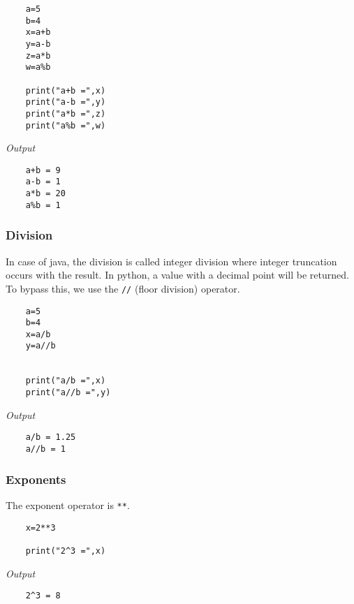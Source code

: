 \documentclass{report}
\begin{document}
	\vspace{-15pt}
	\begin{verbatim}
	a=5
	b=4
	x=a+b
	y=a-b
	z=a*b
	w=a%b
	
	print("a+b =",x)
	print("a-b =",y)
	print("a*b =",z)
	print("a%b =",w)
	\end{verbatim}
	\vspace{-10pt}
	
	\textit{Output}
	\vspace{-15pt}
	\begin{verbatim}
	a+b = 9
	a-b = 1
	a*b = 20
	a%b = 1
	\end{verbatim}
	\vspace{-10pt}
	
	\subsubsection{Division}
	In case of java, the division is called integer division where integer truncation occurs with the result. In python, a value with a decimal point will be returned. To bypass this, we use the \verb|//| (floor division) operator. 
	
	\vspace{-15pt}
	\begin{verbatim}
	a=5
	b=4
	x=a/b
	y=a//b
	
	
	print("a/b =",x)
	print("a//b =",y)
	\end{verbatim}
	\vspace{-10pt}
	
	\textit{Output}
	\vspace{-15pt}
	\begin{verbatim}
	a/b = 1.25
	a//b = 1
	\end{verbatim}
	\vspace{-10pt}
	
	\subsubsection{Exponents}
	The exponent operator is \verb|**|.
	
	\vspace{-15pt}
	\begin{verbatim}
	x=2**3
	
	print("2^3 =",x)
	\end{verbatim}
	\vspace{-10pt}
	
	\textit{Output}
	\vspace{-15pt}
	\begin{verbatim}
	2^3 = 8
	\end{verbatim}
	\vspace{-10pt}
	
\end{document}
